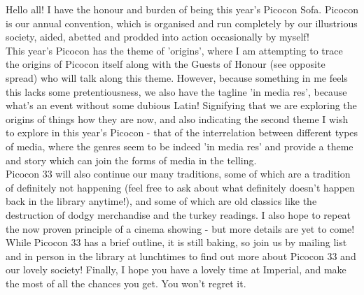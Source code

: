 Hello all! I have the honour and burden of being this year's Picocon Sofa. Picocon is our annual convention, which is organised and run completely by our illustrious society, aided, abetted and prodded into action occasionally by myself! \\
This year's Picocon has the theme of 'origins', where I am attempting to trace the origins of Picocon itself along with the Guests of Honour (see opposite spread) who will talk along this theme. However, because something in me feels this lacks some pretentiousness, we also have the tagline 'in media res', because what's an event without some dubious Latin! Signifying that we are exploring the origins of things how they are now, and also indicating the second theme I wish to explore in this year's Picocon - that of the interrelation between different types of media, where the genres seem to be indeed 'in media res' and provide a theme and story which can join the forms of media in the telling.\\
Picocon 33 will also continue our many traditions, some of which are a tradition of definitely not happening (feel free to ask about what definitely doesn't happen back in the library anytime!), and some of which are old classics like the destruction of dodgy merchandise and the turkey readings. I also hope to repeat the now proven principle of a cinema showing - but more details are yet to come! While Picocon 33 has a brief outline, it is still baking, so join us by mailing list and in person in the library at lunchtimes to find out more about Picocon 33 and our lovely society! Finally, I hope you have a lovely time at Imperial, and make the most of all the chances you get. You won't regret it.